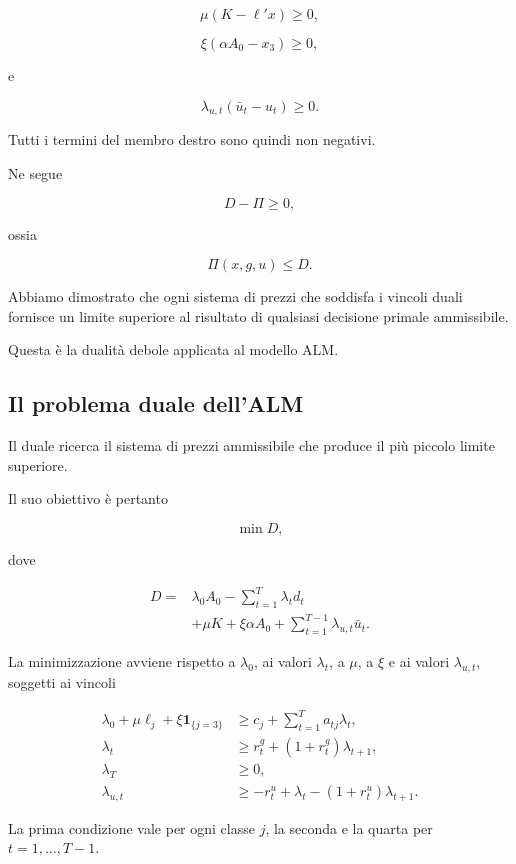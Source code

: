 \[
\mu(K-\ell'x)\geq0,
\]

\[
\xi(\alpha A_0-x_3)\geq0,
\]

\noindent e

\[
\lambda_{u,t}(\bar u_t-u_t)\geq0.
\]

Tutti i termini del membro destro sono
quindi non negativi.

Ne segue

\[
D-\Pi\geq0,
\]

\noindent ossia

\[
\boxed{\Pi(x,g,u)\leq D.}
\]

Abbiamo dimostrato che ogni sistema di
prezzi che soddisfa i vincoli duali
fornisce un limite superiore al risultato
di qualsiasi decisione primale ammissibile.

Questa \`{e} la dualit\`{a} debole
applicata al modello ALM.

\subsection{Il problema duale dell'ALM}

Il duale ricerca il sistema di prezzi
ammissibile che produce il pi\`{u}
piccolo limite superiore.

Il suo obiettivo \`{e} pertanto

\[
\min D,
\]

\noindent dove

\[
\begin{aligned}
D={}&
\lambda_0 A_0
-\sum_{t=1}^{T}\lambda_t d_t\\
&+\mu K+\xi\alpha A_0
+\sum_{t=1}^{T-1}\lambda_{u,t}\bar u_t.
\end{aligned}
\]

La minimizzazione avviene rispetto a
$\lambda_0$, ai valori $\lambda_t$,
a $\mu$, a $\xi$ e ai valori
$\lambda_{u,t}$, soggetti ai vincoli

\[
\begin{aligned}
\lambda_0+\mu\ell_j
+\xi\mathbf{1}_{\{j=3\}}
&\geq
c_j+\sum_{t=1}^{T}a_{tj}\lambda_t,
\\
\lambda_t
&\geq
r_t^g+(1+r_t^g)\lambda_{t+1},
\\
\lambda_T&\geq0,
\\
\lambda_{u,t}
&\geq
-r_t^u+\lambda_t
-(1+r_t^u)\lambda_{t+1}.
\end{aligned}
\]

La prima condizione vale per ogni classe
$j$, la seconda e la quarta per
$t=1,\ldots,T-1$.

